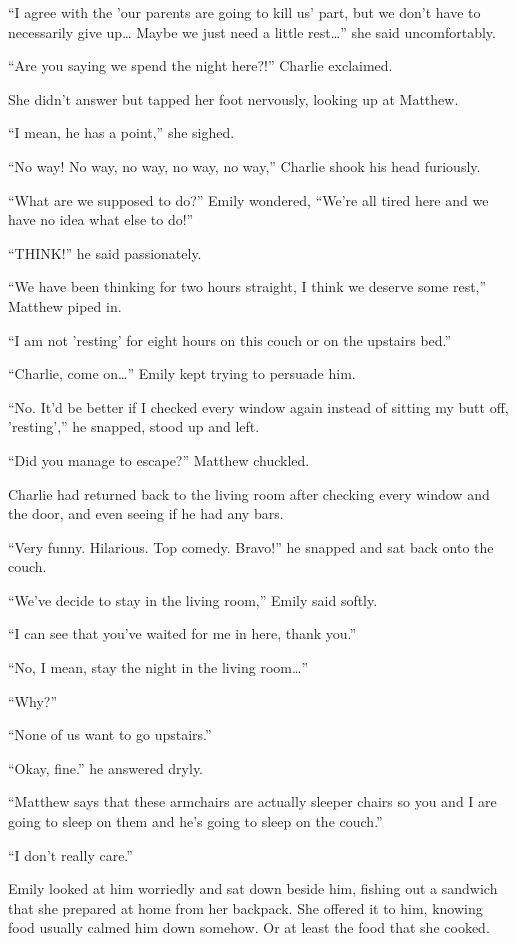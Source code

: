 “I agree with the 'our parents are going to kill us' part, but we don't have to necessarily give up… Maybe we just need a little rest…” she said uncomfortably.

“Are you saying we spend the night here?!” Charlie exclaimed.

She didn't answer but tapped her foot nervously, looking up at Matthew.

“I mean, he has a point,” she sighed.

“No way! No way, no way, no way, no way,” Charlie shook his head furiously.

“What are we supposed to do?” Emily wondered, “We're all tired here and we have no idea what else to do!”

“THINK!” he said passionately.

“We have been thinking for two hours straight, I think we deserve some rest,” Matthew piped in.

“I am not 'resting' for eight hours on this couch or on the upstairs bed.”

“Charlie, come on…” Emily kept trying to persuade him.

“No. It'd be better if I checked every window again instead of sitting my butt off, 'resting',” he snapped, stood up and left.

\bigskip

“Did you manage to escape?” Matthew chuckled.

Charlie had returned back to the living room after checking every window and the door, and even seeing if he had any bars.

“Very funny. Hilarious. Top comedy. Bravo!” he snapped and sat back onto the couch.

“We've decide to stay in the living room,” Emily said softly.

“I can see that you've waited for me in here, thank you.”

“No, I mean, stay the night in the living room…”

“Why?”

“None of us want to go upstairs.”

“Okay, fine.” he answered dryly.

“Matthew says that these armchairs are actually sleeper chairs so you and I are going to sleep on them and he's going to sleep on the couch.”

“I don't really care.”

Emily looked at him worriedly and sat down beside him, fishing out a sandwich that she prepared at home from her backpack. She offered it to him, knowing food usually calmed him down somehow. Or at least the food that she cooked.

